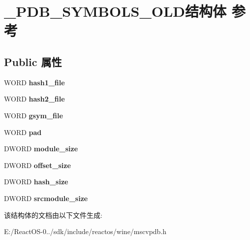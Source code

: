 \hypertarget{struct___p_d_b___s_y_m_b_o_l_s___o_l_d}{}\section{\+\_\+\+P\+D\+B\+\_\+\+S\+Y\+M\+B\+O\+L\+S\+\_\+\+O\+L\+D结构体 参考}
\label{struct___p_d_b___s_y_m_b_o_l_s___o_l_d}
\subsection*{Public 属性}
\begin{DoxyCompactItemize}
\item 
\mbox{\label{struct___p_d_b___s_y_m_b_o_l_s___o_l_d_a4b46a07095897268ba1158b90d0cd0f9}} 
W\+O\+RD {\bfseries hash1\+\_\+file}
\item 
\mbox{\label{struct___p_d_b___s_y_m_b_o_l_s___o_l_d_af86ad3a3b7e8df7128be7526ed133d5f}} 
W\+O\+RD {\bfseries hash2\+\_\+file}
\item 
\mbox{\label{struct___p_d_b___s_y_m_b_o_l_s___o_l_d_af46b608ee2d600c8d4d658066b0645c0}} 
W\+O\+RD {\bfseries gsym\+\_\+file}
\item 
\mbox{\label{struct___p_d_b___s_y_m_b_o_l_s___o_l_d_af537b3caae40026491850f3110191964}} 
W\+O\+RD {\bfseries pad}
\item 
\mbox{\label{struct___p_d_b___s_y_m_b_o_l_s___o_l_d_a55218d62685ff59de014948147c369f6}} 
D\+W\+O\+RD {\bfseries module\+\_\+size}
\item 
\mbox{\label{struct___p_d_b___s_y_m_b_o_l_s___o_l_d_a42cd714647e3ff696d646f94ffd06c90}} 
D\+W\+O\+RD {\bfseries offset\+\_\+size}
\item 
\mbox{\label{struct___p_d_b___s_y_m_b_o_l_s___o_l_d_a45f7a1b7ee52d5754a16ea778b55c8f2}} 
D\+W\+O\+RD {\bfseries hash\+\_\+size}
\item 
\mbox{\label{struct___p_d_b___s_y_m_b_o_l_s___o_l_d_aae64e83dbac9d020651e1bb5c5dcb6d9}} 
D\+W\+O\+RD {\bfseries srcmodule\+\_\+size}
\end{DoxyCompactItemize}


该结构体的文档由以下文件生成\+:\begin{DoxyCompactItemize}
\item 
E\+:/\+React\+O\+S-\/0../sdk/include/reactos/wine/mscvpdb.\+h\end{DoxyCompactItemize}
